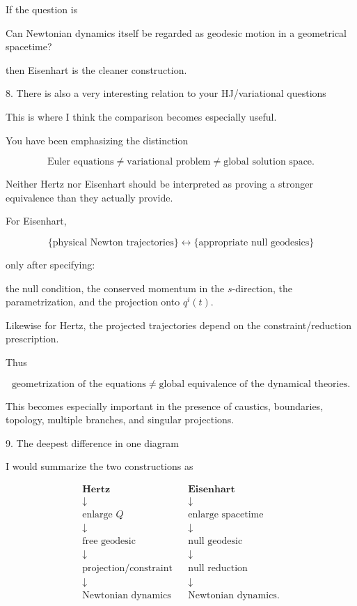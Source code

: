 If the question is

Can Newtonian dynamics itself be regarded as geodesic motion in a geometrical spacetime?

then Eisenhart is the cleaner construction.

8. There is also a very interesting relation to your HJ/variational questions

This is where I think the comparison becomes especially useful.

You have been emphasizing the distinction

$$ \text{Euler equations} \neq \text{variational problem} \neq \text{global solution space}. $$

Neither Hertz nor Eisenhart should be interpreted as proving a stronger equivalence than they actually provide.

For Eisenhart,

$$ \{\text{physical Newton trajectories}\} \longleftrightarrow \{\text{appropriate null geodesics}\} $$

only after specifying:

the null condition,
the conserved momentum in the \(s\)-direction,
the parametrization,
and the projection onto \(q^i(t)\).

Likewise for Hertz, the projected trajectories depend on the constraint/reduction prescription.

Thus

$$ \boxed{ \text{geometrization of the equations} \neq \text{global equivalence of the dynamical theories}. } $$

This becomes especially important in the presence of caustics, boundaries, topology, multiple branches, and singular projections.

9. The deepest difference in one diagram

I would summarize the two constructions as

$$ \begin{array}{ccc} \textbf{Hertz} & & \textbf{Eisenhart} \\[4pt] \downarrow && \downarrow \\[4pt] \text{enlarge }Q && \text{enlarge spacetime} \\ \downarrow && \downarrow \\ \text{free geodesic} && \text{null geodesic} \\ \downarrow && \downarrow \\ \text{projection/constraint} && \text{null reduction} \\ \downarrow && \downarrow \\ \text{Newtonian dynamics} && \text{Newtonian dynamics}. \end{array} $$

